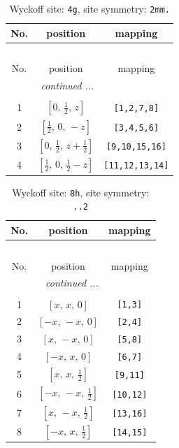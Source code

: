 \documentclass[fleqn,8pt]{jsarticle}
\begin{document}
\renewcommand{\arraystretch}{1.2}
\begin{longtable}{ccc}
\caption{Wyckoff site: {\tt 4g}, site symmetry: {\tt 2mm.}}
 \\
 \hline \hline
No. & position & mapping \\ \hline \endfirsthead

\multicolumn{2}{l}{\tablename\ \thetable{}} \\
 \hline \hline
No. & position & mapping \\ \hline \endhead

 \hline \hline
\multicolumn{2}{r}{\footnotesize\it continued ...} \\ \endfoot

 \hline \hline
\multicolumn{2}{r}{} \\ \endlastfoot

1 & $\left[ 0,\, \frac{1}{2},\, z \right]$ & {\tt [1,2,7,8]} \\ \hline
2 & $\left[ \frac{1}{2},\, 0,\, - z \right]$ & {\tt [3,4,5,6]} \\ \hline
3 & $\left[ 0,\, \frac{1}{2},\, z + \frac{1}{2} \right]$ & {\tt [9,10,15,16]} \\ \hline
4 & $\left[ \frac{1}{2},\, 0,\, \frac{1}{2} - z \right]$ & {\tt [11,12,13,14]} \\
\end{longtable}
\renewcommand{\arraystretch}{1.2}
\begin{longtable}{ccc}
\caption{Wyckoff site: {\tt 8h}, site symmetry: {\tt ..2}}
 \\
 \hline \hline
No. & position & mapping \\ \hline \endfirsthead

\multicolumn{2}{l}{\tablename\ \thetable{}} \\
 \hline \hline
No. & position & mapping \\ \hline \endhead

 \hline \hline
\multicolumn{2}{r}{\footnotesize\it continued ...} \\ \endfoot

 \hline \hline
\multicolumn{2}{r}{} \\ \endlastfoot

1 & $\left[ x,\, x,\, 0 \right]$ & {\tt [1,3]} \\ \hline
2 & $\left[ - x,\, - x,\, 0 \right]$ & {\tt [2,4]} \\ \hline
3 & $\left[ x,\, - x,\, 0 \right]$ & {\tt [5,8]} \\ \hline
4 & $\left[ - x,\, x,\, 0 \right]$ & {\tt [6,7]} \\ \hline
5 & $\left[ x,\, x,\, \frac{1}{2} \right]$ & {\tt [9,11]} \\ \hline
6 & $\left[ - x,\, - x,\, \frac{1}{2} \right]$ & {\tt [10,12]} \\ \hline
7 & $\left[ x,\, - x,\, \frac{1}{2} \right]$ & {\tt [13,16]} \\ \hline
8 & $\left[ - x,\, x,\, \frac{1}{2} \right]$ & {\tt [14,15]} \\
\end{longtable}
\end{document}
